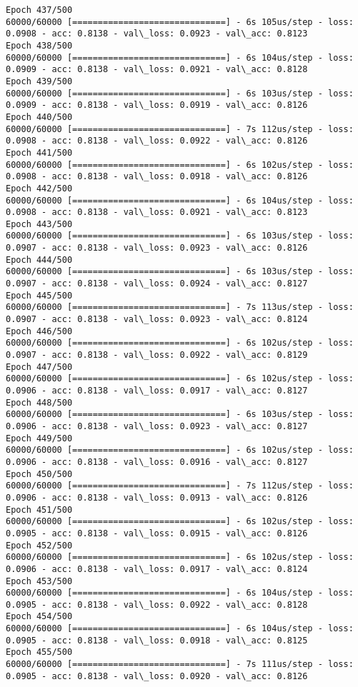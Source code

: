\documentclass[11pt]{article}
\begin{document}
\begin{Verbatim}[commandchars=\\\{\}]
Epoch 437/500
60000/60000 [==============================] - 6s 105us/step - loss: 0.0908 - acc: 0.8138 - val\_loss: 0.0923 - val\_acc: 0.8123
Epoch 438/500
60000/60000 [==============================] - 6s 104us/step - loss: 0.0909 - acc: 0.8138 - val\_loss: 0.0921 - val\_acc: 0.8128
Epoch 439/500
60000/60000 [==============================] - 6s 103us/step - loss: 0.0909 - acc: 0.8138 - val\_loss: 0.0919 - val\_acc: 0.8126
Epoch 440/500
60000/60000 [==============================] - 7s 112us/step - loss: 0.0908 - acc: 0.8138 - val\_loss: 0.0922 - val\_acc: 0.8126
Epoch 441/500
60000/60000 [==============================] - 6s 102us/step - loss: 0.0908 - acc: 0.8138 - val\_loss: 0.0918 - val\_acc: 0.8126
Epoch 442/500
60000/60000 [==============================] - 6s 104us/step - loss: 0.0908 - acc: 0.8138 - val\_loss: 0.0921 - val\_acc: 0.8123
Epoch 443/500
60000/60000 [==============================] - 6s 103us/step - loss: 0.0907 - acc: 0.8138 - val\_loss: 0.0923 - val\_acc: 0.8126
Epoch 444/500
60000/60000 [==============================] - 6s 103us/step - loss: 0.0907 - acc: 0.8138 - val\_loss: 0.0924 - val\_acc: 0.8127
Epoch 445/500
60000/60000 [==============================] - 7s 113us/step - loss: 0.0907 - acc: 0.8138 - val\_loss: 0.0923 - val\_acc: 0.8124
Epoch 446/500
60000/60000 [==============================] - 6s 102us/step - loss: 0.0907 - acc: 0.8138 - val\_loss: 0.0922 - val\_acc: 0.8129
Epoch 447/500
60000/60000 [==============================] - 6s 102us/step - loss: 0.0906 - acc: 0.8138 - val\_loss: 0.0917 - val\_acc: 0.8127
Epoch 448/500
60000/60000 [==============================] - 6s 103us/step - loss: 0.0906 - acc: 0.8138 - val\_loss: 0.0923 - val\_acc: 0.8127
Epoch 449/500
60000/60000 [==============================] - 6s 102us/step - loss: 0.0906 - acc: 0.8138 - val\_loss: 0.0916 - val\_acc: 0.8127
Epoch 450/500
60000/60000 [==============================] - 7s 112us/step - loss: 0.0906 - acc: 0.8138 - val\_loss: 0.0913 - val\_acc: 0.8126
Epoch 451/500
60000/60000 [==============================] - 6s 102us/step - loss: 0.0905 - acc: 0.8138 - val\_loss: 0.0915 - val\_acc: 0.8126
Epoch 452/500
60000/60000 [==============================] - 6s 102us/step - loss: 0.0906 - acc: 0.8138 - val\_loss: 0.0917 - val\_acc: 0.8124
Epoch 453/500
60000/60000 [==============================] - 6s 104us/step - loss: 0.0905 - acc: 0.8138 - val\_loss: 0.0922 - val\_acc: 0.8128
Epoch 454/500
60000/60000 [==============================] - 6s 104us/step - loss: 0.0905 - acc: 0.8138 - val\_loss: 0.0918 - val\_acc: 0.8125
Epoch 455/500
60000/60000 [==============================] - 7s 111us/step - loss: 0.0905 - acc: 0.8138 - val\_loss: 0.0920 - val\_acc: 0.8126

\end{Verbatim}
\end{document}
